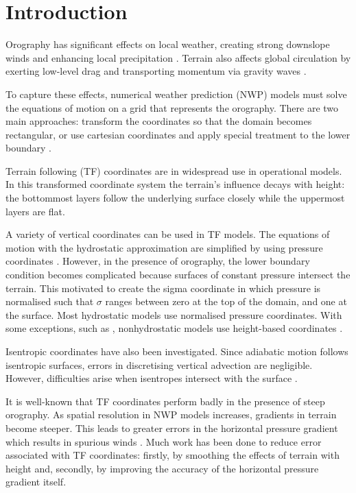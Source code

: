 \chapter{Introduction}

Orography has significant effects on local weather, creating strong downslope winds and enhancing local precipitation \autocite{barry2008}.  Terrain also affects global circulation by exerting low-level drag \autocite{lott-miller1997} and transporting momentum via gravity waves \autocite{mcfarlane1987}.

To capture these effects, numerical weather prediction (NWP) models must solve the equations of motion on a grid that represents the orography.
There are two main approaches: transform the coordinates so that the domain becomes rectangular, or use cartesian coordinates and apply special treatment to the lower boundary \autocite{galchen-somerville1975}.

Terrain following (TF) coordinates are in widespread use in operational models.  In this transformed coordinate system the terrain's influence decays with height: the bottommost layers follow the underlying surface closely while the uppermost layers are flat.

A variety of vertical coordinates can be used in TF models.  The equations of motion with the hydrostatic approximation are simplified by using pressure coordinates \autocite{eliassen1949}.  However, in the presence of orography, the lower boundary condition becomes complicated because surfaces of constant pressure intersect the terrain.  This motivated \textcite{phillips1957} to create the sigma coordinate in which pressure is normalised such that $\sigma$ ranges between zero at the top of the domain, and one at the surface.
Most hydrostatic models use normalised pressure coordinates.  With some exceptions, such as \textcite{xue-thorpe1991}, nonhydrostatic models use height-based coordinates \autocite{steppeler2003}.

Isentropic coordinates have also been investigated.  Since adiabatic motion follows isentropic surfaces, errors in discretising vertical advection are negligible.  However, difficulties arise when isentropes intersect with the surface \autocite{konor-arakawa1997}.

It is well-known that TF coordinates perform badly in the presence of steep orography.  As spatial resolution in NWP models increases, gradients in terrain become steeper.  This leads to greater errors in the horizontal pressure gradient which results in spurious winds \autocite{dempsey-davis1998}.  Much work has been done to reduce error associated with TF coordinates: firstly, by smoothing the effects of terrain with height and, secondly, by improving the accuracy of the horizontal pressure gradient itself.

